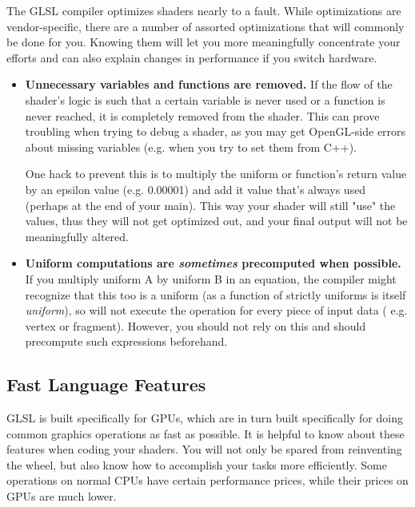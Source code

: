 \documentclass{scrartcl}
\begin{document}
The GLSL compiler optimizes shaders nearly to a fault. While optimizations are vendor-specific, there are a number of assorted optimizations that will commonly be done for you. Knowing them will let you more meaningfully concentrate your efforts and can also explain changes in performance if you switch hardware.

\begin{itemize}

\item \textbf{ Unnecessary variables and functions are removed. } If the flow of the shader's logic is such that a certain variable is never used or a function is never reached, it is completely removed from the shader. This can prove troubling when trying to debug a shader, as you may get OpenGL-side errors about missing variables (e.g. when you try to set them from C++).

\quad One hack to prevent this is to multiply the uniform or function's return value by an epsilon value (e.g. 0.00001) and add it value that's always used (perhaps at the end of your main). This way your shader will still "use" the values, thus they will not get optimized out, and your final output will not be meaningfully altered.

\item \textbf{ Uniform computations are \textit{sometimes} precomputed when possible.} If you multiply uniform A by uniform B in an equation, the compiler might recognize that this too is a uniform (as a function of strictly uniforms is itself \textit{uniform}), so will not execute the operation for every piece of input data ( e.g. vertex or fragment). However, you should not rely on this and should precompute such expressions beforehand.

\end{itemize}

\subsection{ Fast Language Features }

GLSL is built specifically for GPUs, which are in turn built specifically for doing common graphics operations as fast as possible. It is helpful to know about these features when coding your shaders. You will not only be spared from reinventing the wheel, but also know how to accomplish your tasks more efficiently. Some operations on normal CPUs have certain performance prices, while their prices on GPUs are much lower.
\end{document}

